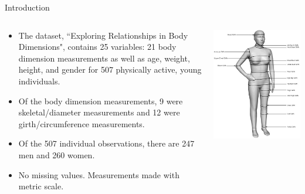 \documentclass[table]{beamer}\usepackage[]{graphicx}\usepackage[]{color}
\begin{document}
\begin{frame}{Introduction}



\begin{columns}[c] %
\begin{column}[c]{6cm} %
{\fontsize{0.3cm}{1em}\selectfont
\begin{itemize}
  \item The dataset, ``Exploring Relationships in Body Dimensions", contains 25 variables: 21 body dimension measurements as well as age, weight, height, and gender for 507 physically active, young individuals.
  \item Of the body dimension measurements, 9 were skeletal/diameter measurements and 12 were girth/circumference measurements.
  \item Of the 507 individual observations, there are 247 men and 260 women.
  \item No missing values. Measurements made with metric scale.
\end{itemize}
}
\end{column}

\begin{column}[c]{6cm} 
\includegraphics[width=\textwidth]{body}
\end{column}
\end{columns}

\end{frame}
\end{document}
